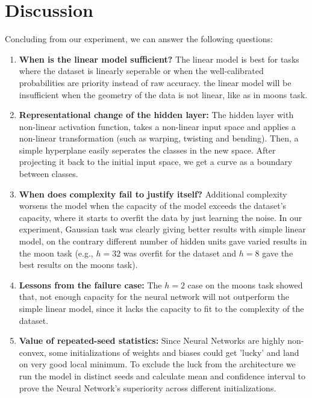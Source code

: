 \documentclass[11pt]{article}
\begin{document}
\newpage
\section{Discussion}
Concluding from our experiment, we can answer the following questions:\begin{enumerate}\item \textbf{When is the linear model sufficient?} The linear model is best for tasks where the dataset is linearly seperable or when the well-calibrated probabilities are priority instead of raw accuracy. the linear model will be insufficient when the geometry of the data is not linear, like as in moons task.\item \textbf{Representational change of the hidden layer:} The hidden layer with non-linear activation function, takes a non-linear input space and applies a non-linear transformation (such as warping, twisting and bending). Then, a simple hyperplane easily seperates the classes in the new space. After projecting it back to the initial input space, we get a curve as a boundary between classes.\item \textbf{When does complexity fail to justify itself?} Additional complexity worsens the model when the capacity of the model exceeds the dataset's capacity, where it starts to overfit the data by just learning the noise. In our experiment, Gaussian task was clearly giving better results with simple linear model, on the contrary different number of hidden units gave varied results in the moon task (e.g., $h=32$ was overfit for the dataset and $h=8$ gave the best results on the moons task).\item \textbf{Lessons from the failure case:} The $h=2$ case on the moons task showed that, not enough capacity for the neural network will not outperform the simple linear model, since it lacks the capacity to fit to the complexity of the dataset.\item \textbf{Value of repeated-seed statistics:} Since Neural Networks are highly non-convex, some initializations of weights and biases could get 'lucky' and land on very good local minimum. To exclude the luck from the architecture we run the model in distinct seeds and calculate mean and confidence interval to prove the Neural Network's superiority across different initializations.\end{enumerate}

\end{document}

